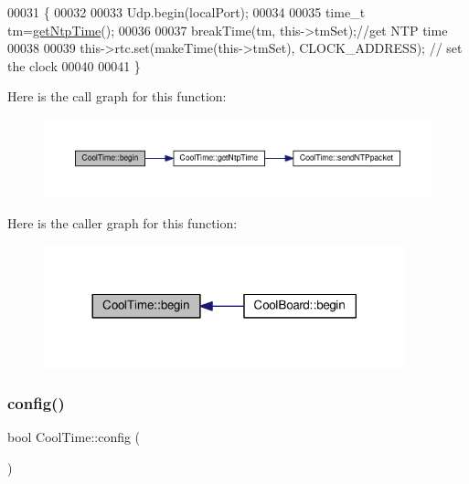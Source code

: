 \begin{DoxyCode}
00031 \{
00032 
00033     Udp.begin(localPort);
00034 
00035     time\_t tm=\hyperlink{class_cool_time_a41fbbbfd651c2079f54d4b2911e4c705}{getNtpTime}();
00036 
00037     breakTime(tm, this->tmSet);\textcolor{comment}{//get NTP time}
00038 
00039     this->rtc.set(makeTime(this->tmSet), CLOCK\_ADDRESS); \textcolor{comment}{// set the clock}
00040     
00041 \}
\end{DoxyCode}
Here is the call graph for this function\+:
\nopagebreak
\begin{figure}[H]
\begin{center}
\leavevmode
\includegraphics[width=350pt]{class_cool_time_ab1976cf718b950bc31e003c3323b8adb_cgraph}
\end{center}
\end{figure}
Here is the caller graph for this function\+:
\nopagebreak
\begin{figure}[H]
\begin{center}
\leavevmode
\includegraphics[width=296pt]{class_cool_time_ab1976cf718b950bc31e003c3323b8adb_icgraph}
\end{center}
\end{figure}
\mbox{\label{class_cool_time_a87c28260c1bc77091162cbcf1ee2e129}} 
\subsubsection{\texorpdfstring{config()}{config()}\hspace{0.1cm}{\footnotesize\ttfamily [1/2]}}
{\footnotesize\ttfamily bool Cool\+Time\+::config (\begin{DoxyParamCaption}{ }\end{DoxyParamCaption})}

